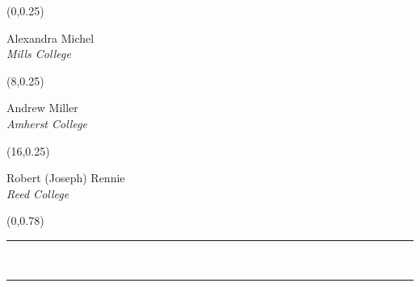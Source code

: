 \documentclass[a0]{a0poster}
\theoremstyle{definition}
\newcommand\doubleline{\hrule\ \vspace{-10pt} \hrule}
\begin{document}
\newcommand{\firstauthor}{Alexandra Michel}
\newcommand{\firstauthoruni}{Mills College}
\newcommand{\firstauthoremail}{amichel@mills.edu}
\newcommand{\secondauthor}{Andrew Miller}
\newcommand{\secondauthoruni}{Amherst College}
\newcommand{\secondauthoremail}{amiller@amherst.edu}
\newcommand{\thirdauthor}{Robert (Joseph) Rennie}
\newcommand{\thirdauthoruni}{Reed College}
\newcommand{\thirdauthoremail}{jrennie@reed.edu}
\begin{textblock}{7}(0,0.25)
  \begin{center}
    {\color{DarkBlue}\LARGE
  \firstauthor}\\
  {\color{DarkBlue}\Large{\it \firstauthoruni}}
\end{center}
\end{textblock}
\begin{textblock}{7}(8,0.25)
  \begin{center}
    {\color{DarkBlue}\LARGE
  \secondauthor}\\
  {\color{DarkBlue}\Large{\it \secondauthoruni}}
\end{center}
\end{textblock}
\begin{textblock}{7}(16,0.25)
  \begin{center}
    {\color{DarkBlue}\LARGE
  \thirdauthor}\\
  {\color{DarkBlue}\Large{\it \thirdauthoruni}}
\end{center}
\end{textblock}
\begin{textblock}{23}(0,0.78)
  \begin{center}
    \smallskip
    \doubleline
  \end{center}
\end{textblock}
\end{document}
